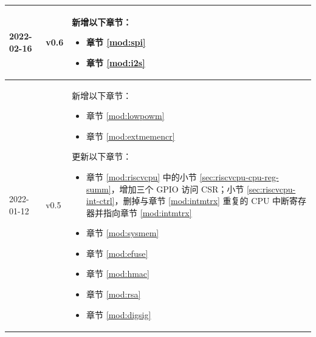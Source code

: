 \begin{longtable}[l]{ | m{2cm} | m{1.5cm} | m{12cm} | }
    2022-02-16       & v0.6 &
        新增以下章节：
            \begin{itemize}
                \item 章节 \ref{mod:spi} \textit{\nameref{mod:spi}}
                \item 章节 \ref{mod:i2s} \textit{\nameref{mod:i2s}}
            \end{itemize}\\\hline
    2022-01-12       & v0.5 &
        新增以下章节：
            \begin{itemize}
                \item 章节 \ref{mod:lowpowm} \textit{\nameref{mod:lowpowm}}
                \item 章节 \ref{mod:extmemencr} \textit{\nameref{mod:extmemencr}}
            \end{itemize}
        更新以下章节：
            \begin{itemize}
                \item 章节 \ref{mod:riscvcpu} \textit{\nameref{mod:riscvcpu}} 中的小节 \ref{sec:riscvcpu-cpu-reg-summ}，增加三个 GPIO 访问 CSR；小节 \ref{sec:riscvcpu-int-ctrl}，删掉与章节 \ref{mod:intmtrx} \textit{\nameref{mod:intmtrx}} 重复的 CPU 中断寄存器并指向章节 \ref{mod:intmtrx} \textit{\nameref{mod:intmtrx}}
                \item 章节 \ref{mod:sysmem} \textit{\nameref{mod:sysmem}}
                \item 章节 \ref{mod:efuse} \textit{\nameref{mod:efuse}}
                \item 章节 \ref{mod:hmac} \textit{\nameref{mod:hmac}}
                \item 章节 \ref{mod:rsa} \textit{\nameref{mod:rsa}}
                \item 章节 \ref{mod:digsig} \textit{\nameref{mod:digsig}}
            \end{itemize} \\\hline


\end{longtable}
